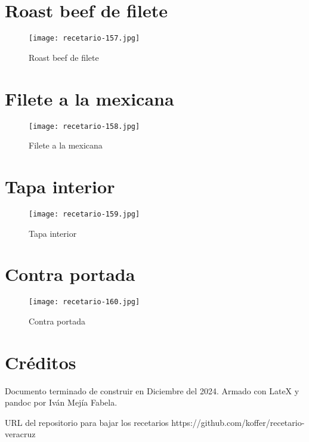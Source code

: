 \documentclass[12pt,letterpaper]{article}
\begin{document}
\newpage

\section{Roast beef de filete}
  \begin{figure}[H]
    \vspace{2pt}
  \texttt{[image: recetario-157.jpg]}
    \caption{Roast beef de filete}
    
  \end{figure}

\newpage

\section{Filete a la mexicana}
  \begin{figure}[H]
    \vspace{2pt}
  \texttt{[image: recetario-158.jpg]}
    \caption{Filete a la mexicana}
    
  \end{figure}

\newpage

\section{Tapa interior}
  \begin{figure}[H]
    \vspace{2pt}
  \texttt{[image: recetario-159.jpg]}
    \caption{Tapa interior}
    
  \end{figure}


\newpage

\section{Contra portada}
  \begin{figure}[H]
    \vspace{2pt}
  \texttt{[image: recetario-160.jpg]}
    \caption{Contra portada}
    
  \end{figure}





  \section{Créditos}

  Documento terminado de construir en Diciembre del 2024.
  Armado con LateX y pandoc por Iván Mejía Fabela.

  URL del repositorio para bajar los recetarios
  https://github.com/koffer/recetario-veracruz
\end{document}
